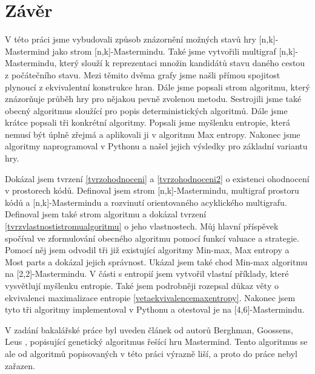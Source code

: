 \chapter*{Závěr}

V této práci jsme vybudovali způsob znázornění možných stavů hry [n,k]-Mastermind jako strom [n,k]-Mastermindu. Také jsme vytvořili multigraf [n,k]-Mastermindu, který slouží k reprezentaci množin kandidátů stavu daného cestou z počátečního stavu. Mezi těmito dvěma grafy jsme našli přímou spojitost plynoucí z ekvivalentní konstrukce hran. Dále jsme popsali strom algoritmu, který znázorňuje průběh hry pro nějakou pevně zvolenou metodu. Sestrojili jsme také obecný algoritmus sloužící pro popis deterministických algoritmů. Dále jsme krátce popsali tři konkrétní algoritmy. Popsali jsme myšlenku entropie, která nemusí být úplně zřejmá a aplikovali ji v algoritmu Max entropy. Nakonec jsme algoritmy naprogramoval v Pythonu a našel jejich výsledky pro základní variantu hry. 

Dokázal jsem tvrzení \ref{tvrzohodnoceni} a \ref{tvrzohodnoceni2} o existenci ohodnocení v prostorech kódů. Definoval jsem strom [n,k]-Mastermindu, multigraf prostoru kódů a [n,k]-Mastermindu a rozvinutí orientovaného acyklického multigrafu. Definoval jsem také strom algoritmu a dokázal tvrzení \ref{tvrzvlastnostistromualgoritmu} o jeho vlastnostech. Můj hlavní příspěvek spočíval ve zformulování obecného algoritmu pomocí funkcí valuace a strategie. Pomocí něj jsem odvodil tři již existující algoritmy Min-max, Max entropy a Most parts a dokázal jejich správnost. Ukázal jsem také chod Min-max algoritmu na [2,2]-Mastermindu. V části s entropií jsem vytvořil vlastní příklady, které vysvětlují myšlenku entropie. Také jsem podrobněji rozepsal důkaz věty o ekvivalenci maximalizace entropie \ref{vetaekvivalencemaxentropy}. Nakonec jsem tyto tři algoritmy implementoval v Pythonu a otestoval je na [4,6]-Mastermindu. 

V zadání bakalářské práce byl uveden článek od autorů Berghman, Goossens, Leus \cite{BERGHMAN20091880}, popisující genetický algoritmus řešící hru Mastermind. Tento algoritmus se ale od algoritmů popisovaných v této práci výrazně liší, a proto do práce nebyl zařazen. 

